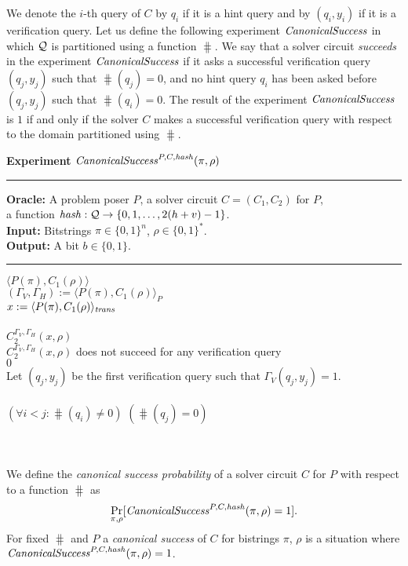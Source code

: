 We denote the $i$-th query of $C$ by $q_i$ if it is a hint query and by $(q_i, y_i)$ if it is a verification query.
Let us define the following experiment $\operatorname{\mathit{CanonicalSuccess}}$ in which $\mathcal{Q}$ is partitioned using a function $\hash$.
We say that a solver circuit \textit{succeeds} in the experiment $\operatorname{\mathit{CanonicalSuccess}}$
if it asks a successful verification query $(q_j, y_j)$ such that $\hash(q_j) = 0$,
and no hint query $q_i$ has been asked before $(q_j, y_j)$ such that $\hash(q_i) = 0$.
The result of the experiment $\operatorname{\mathit{CanonicalSuccess}}$ is $1$ if and only if the solver $C$ makes
a successful verification query with respect to the domain partitioned using $\hash$.
%
\begin{codeblock}
  \textbf{Experiment} $\operatorname{\mathit{CanonicalSuccess}}^{P, C, \operatorname{\mathit{hash}}}(\pi, \rho)$
  \medskip \hrule
  \textbf{Oracle:} A problem poser $P$, a solver circuit $C = (C_1, C_2)$ for $P$,\\
  \IndII a function $\operatorname{\mathit{hash}}: \mathcal{Q} \rightarrow \{0, 1, \dotsc, 2(h+v) - 1\}$.\\
  \textbf{Input:}  Bitstrings $\pi \in \{0,1\}^n$, $\rho \in \{0,1\}^*$. \\
  \textbf{Output:} A bit $b \in \{0,1\}$.
  \medskip\hrule
  \Run $\langle P(\pi), C_1(\rho) \rangle$ \\
  \IndI $(\Gamma_V, \Gamma_H) := \langle P(\pi), C_1(\rho) \rangle_{P}$ \\
  \IndI $x := \langle P(\pi), C_1(\rho) \rangle_{\operatorname{\mathit{trans}}}$ \\ \\
  \Run $C_2^{\Gamma_V, \Gamma_H} (x, \rho)$ \\
  \IndI \If $C_2^{\Gamma_V, \Gamma_H} (x, \rho)$ does not succeed for any verification query \Then \\
  \IndII \Return $0$ \\
  \IndI Let $(q_j,y_j)$ be the first verification query such that $\Gamma_V(q_j, y_j) = 1$.\\
  \\
  \If $(\forall i < j :  \hash(q_i) \neq 0)$ \And $(\hash(q_j) = 0)$ \Then \\
  \IndI {}\\
  \Else\\
  \IndI {}
\end{codeblock}
%
We define the \textit{canonical success probability} of a solver circuit $C$ for $P$ with respect to a function $\hash$ as
\begin{align}
 \underset{\pi, \rho}{\Pr}[\operatorname{\mathit{CanonicalSuccess}}^{P, C, \operatorname{\mathit{hash}}}(\pi, \rho) = 1].
\end{align}
%
For fixed $\hash$ and $P$ a \textit{canonical success} of $C$ for bistrings $\pi$, $\rho$ is a situation where
$\operatorname{\mathit{CanonicalSuccess}}^{P, C, \operatorname{\mathit{hash}}}(\pi, \rho) = 1$.

